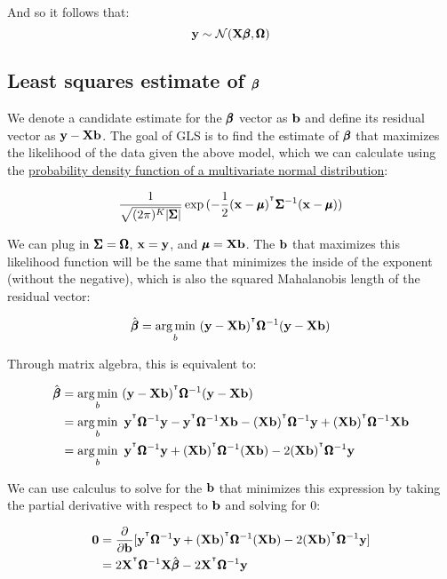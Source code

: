 \documentclass[12pt]{article}
\begin{document}
And so it follows that:
$$ \mathbf{y} \sim \mathcal{N} (\mathbf{X} \pmb{\beta}, \pmb{\Omega}) $$





\subsection[Least squares estimate of beta]{Least squares estimate of $\pmb{\beta}$}

We denote a candidate estimate for the $\pmb{\beta}$ vector as $\mathbf{b}$ and define its residual vector as $ \mathbf{y} - \mathbf{X} \mathbf{b} $. The goal of GLS is to find the estimate of $\pmb{\beta}$ that maximizes the likelihood of the data given the above model, which we can calculate using the \href{https://en.wikipedia.org/wiki/Multivariate_normal_distribution}{probability density function of a multivariate normal distribution}:

$$
\frac{1}{\sqrt{(2 \pi)^K |\pmb{\Sigma}| }}
\exp{(-\frac{1}{2}(\mathbf{x}- \pmb{\mu})^{^\intercal} \pmb{\Sigma}^{-1} (\mathbf{x}- \pmb{\mu}))}
$$

We can plug in $\pmb{\Sigma} = \pmb{\Omega}$, $\mathbf{x} = \mathbf{y}$, and $\pmb{\mu} = \mathbf{X} \mathbf{b}$. The $\mathbf{b}$ that maximizes this likelihood function will be the same that minimizes the inside of the exponent (without the negative), which is also the squared Mahalanobis length of the residual vector:

$$ \hat{\pmb{\beta}} = \operatorname*{arg\,min}_b ~ (\mathbf{y} - \mathbf{X} \mathbf{b})^{^\intercal} \pmb{\Omega}^{-1} (\mathbf{y} - \mathbf{X} \mathbf{b}) $$

Through matrix algebra, this is equivalent to:

\begin{align*}
    \hat{\pmb{\beta}} &= \operatorname*{arg\,min}_b ~ (\mathbf{y} - \mathbf{X} \mathbf{b})^{^\intercal} \pmb{\Omega}^{-1} (\mathbf{y} - \mathbf{X} \mathbf{b}) \\
    &= \operatorname*{arg\,min}_b ~ \mathbf{y}^{^\intercal} \pmb{\Omega}^{-1} \mathbf{y} - \mathbf{y}^{^\intercal} \pmb{\Omega}^{-1} \mathbf{X} \mathbf{b} - (\mathbf{X} \mathbf{b})^{^\intercal} \pmb{\Omega}^{-1} \mathbf{y} + (\mathbf{X} \mathbf{b})^{^\intercal} \pmb{\Omega}^{-1} \mathbf{X} \mathbf{b} \\
    &= \operatorname*{arg\,min}_b ~ \mathbf{y}^{^\intercal} \pmb{\Omega}^{-1} \mathbf{y} + (\mathbf{X} \mathbf{b})^{^\intercal} \pmb{\Omega}^{-1} (\mathbf{X} \mathbf{b}) - 2(\mathbf{X} \mathbf{b})^{^\intercal} \pmb{\Omega}^{-1} \mathbf{y}
\end{align*}

We can use calculus to solve for the $\mathbf{b}$ that minimizes this expression by taking the partial derivative with respect to $\mathbf{b}$ and solving for 0:

\begin{align*}
    \mathbf{0} &= \frac{\partial}{\partial \mathbf{b}} [ \mathbf{y}^{^\intercal} \pmb{\Omega}^{-1} \mathbf{y} + (\mathbf{X} \mathbf{b})^{^\intercal} \pmb{\Omega}^{-1} (\mathbf{X} \mathbf{b}) - 2(\mathbf{X} \mathbf{b})^{^\intercal} \pmb{\Omega}^{-1} \mathbf{y} ]\\
    &=  2 \mathbf{X}^{^\intercal} \pmb{\Omega}^{-1} \mathbf{X} \hat{\pmb{\beta}} - 2 \mathbf{X}^{^\intercal} \pmb{\Omega}^{-1} \mathbf{y}
\end{align*}
\end{document}

